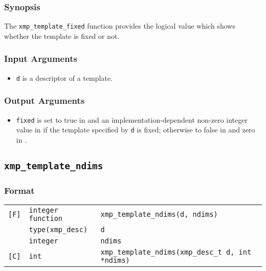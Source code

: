 \subsubsection*{Synopsis}

The {\tt xmp\_template\_fixed} function provides the logical value which
shows whether the template is fixed or not.


\subsubsection*{Input Arguments}
\begin{itemize}
 \item {\tt d} is a descriptor of a template.
\end{itemize}

\subsubsection*{Output Arguments}
\begin{itemize}
 \item {\tt fixed} is set to true in {\XMPF} and an
       implementation-dependent non-zero integer value in {\XMPC} if the
       template specified by {\tt d} is fixed; otherwise to false in
       {\XMPF} and zero in {\XMPC}.
\end{itemize}

\subsection{\tt xmp\_template\_ndims}

\subsubsection*{Format}

\begin{tabular}{lll}

\verb![F]!& {\tt integer function}& {\tt xmp\_template\_ndims(d, ndims)}\\
          & {\tt type(xmp\_desc)} & {\tt d}\\
          & {\tt integer} & {\tt ndims}\\

\verb![C]!&  {\tt int}& {\tt xmp\_template\_ndims(xmp\_desc\_t d, int *ndims)}\\

\end{tabular}


